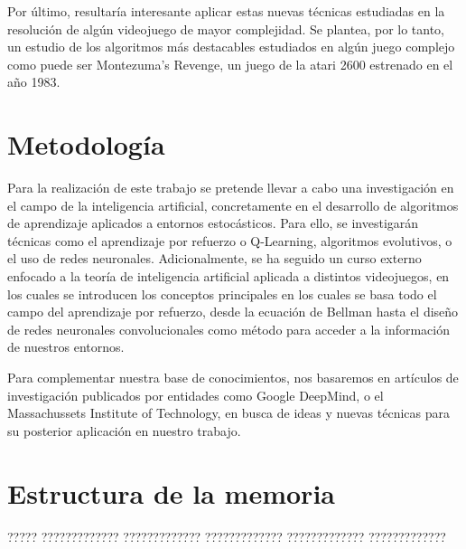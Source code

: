 \documentclass[11pt,spanish,listoffigures,listoftables]{tfgetsinf}
\begin{document}
Por último, resultaría interesante aplicar estas nuevas técnicas estudiadas en la resolución de algún videojuego de mayor complejidad. Se plantea, por lo tanto, un estudio de los algoritmos más destacables estudiados en algún juego complejo como puede ser Montezuma's Revenge, un juego de la atari 2600 estrenado en el año 1983.


\section{Metodología}

Para la realización de este trabajo se pretende llevar a cabo una investigación en el campo de la inteligencia artificial, concretamente en el desarrollo de algoritmos de aprendizaje aplicados a entornos estocásticos. Para ello, se investigarán técnicas como el aprendizaje por refuerzo o Q-Learning, algoritmos evolutivos, o el uso de redes neuronales. Adicionalmente, se ha seguido un curso externo enfocado a la teoría de inteligencia artificial aplicada a distintos videojuegos, en los cuales se introducen los conceptos principales en los cuales se basa todo el campo del aprendizaje por refuerzo, desde la ecuación de Bellman hasta el diseño de redes neuronales convolucionales como método para acceder a la información de nuestros entornos. \par

Para complementar nuestra base de conocimientos, nos basaremos en artículos de investigación publicados por entidades como Google DeepMind, o el Massachussets Institute of Technology, en busca de ideas y nuevas técnicas para su posterior aplicación en nuestro trabajo.


\section{Estructura de la memoria}

????? ????????????? ????????????? ????????????? ????????????? ????????????? 



\end{document}
